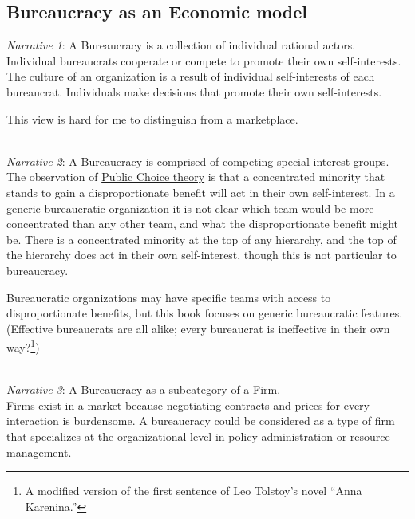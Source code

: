 
\subsection{Bureaucracy as an Economic model}

\textit{Narrative 1}: A Bureaucracy is a collection of individual rational actors. \\
Individual bureaucrats cooperate or compete to promote their own self-interests.
The culture of an organization is a result of individual self-interests of each bureaucrat.
Individuals make decisions that promote their own self-interests.

This view is hard for me to distinguish from a marketplace. 

\ \\

\textit{Narrative 2}: A Bureaucracy is comprised of competing special-interest groups. \\
The observation of \href{https://en.wikipedia.org/wiki/Public_choice}{Public Choice theory} is that a concentrated minority that stands to gain a disproportionate benefit will act in their own self-interest. In a generic bureaucratic organization it is not clear which team would be more concentrated than any other team, and what the disproportionate benefit might be. There is a concentrated minority at the top of any hierarchy, and the top of the hierarchy does act in their own self-interest, though this is not particular to bureaucracy.

Bureaucratic organizations may have specific teams with access to disproportionate benefits, but this book focuses on generic bureaucratic features. (Effective bureaucrats are all alike; every bureaucrat is ineffective in their own way?\footnote{A modified version of the first sentence of Leo Tolstoy's novel ``Anna Karenina.''})


\ \\

\textit{Narrative 3}: A Bureaucracy as a subcategory of a Firm. \\
Firms exist in a market because negotiating contracts and prices for every interaction is burdensome. 
A bureaucracy could be considered as a type of firm that specializes at the organizational level in policy administration or resource management. 

